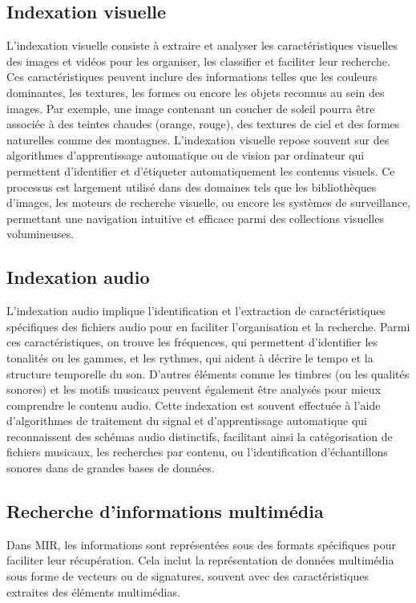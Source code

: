 \begin{section}
 \subsection{Indexation visuelle}

 L’indexation visuelle consiste à extraire et analyser les caractéristiques
 visuelles des images et vidéos pour les organiser, les classifier et faciliter
 leur recherche. Ces caractéristiques peuvent inclure des informations telles
 que les couleurs dominantes, les textures, les formes ou encore les objets
 reconnus au sein des images. Par exemple, une image contenant un coucher de
 soleil pourra être associée à des teintes chaudes (orange, rouge), des textures
 de ciel et des formes naturelles comme des montagnes. L’indexation visuelle
 repose souvent sur des algorithmes d’apprentissage automatique ou de vision par
 ordinateur qui permettent d’identifier et d’étiqueter automatiquement les
 contenus visuels. Ce processus est largement utilisé dans des domaines tels que
 les bibliothèques d’images, les moteurs de recherche visuelle, ou encore les
 systèmes de surveillance, permettant une navigation intuitive et efficace parmi
 des collections visuelles volumineuses.
 \subsection{Indexation audio}
 L’indexation audio implique l’identification et l’extraction de
 caractéristiques spécifiques des fichiers audio pour en faciliter
 l’organisation et la recherche. Parmi ces caractéristiques, on trouve les
 fréquences, qui permettent d’identifier les tonalités ou les gammes, et les
 rythmes, qui aident à décrire le tempo et la structure temporelle du son.
 D’autres éléments comme les timbres (ou les qualités sonores) et les motifs
 musicaux peuvent également être analysés pour mieux comprendre le contenu
 audio. Cette indexation est souvent effectuée à l’aide d’algorithmes de
 traitement du signal et d’apprentissage automatique qui reconnaissent des
 schémas audio distinctifs, facilitant ainsi la catégorisation de fichiers
 musicaux, les recherches par contenu, ou l’identification d’échantillons
 sonores dans de grandes bases de données.

 \section{Recherche d'informations multimédia}
 Dans MIR, les informations sont représentées sous des formats spécifiques pour
 faciliter leur récupération. Cela inclut la représentation de données
 multimédia sous forme de vecteurs ou de signatures, souvent avec des
 caractéristiques extraites des éléments multimédias.

\end{section}
